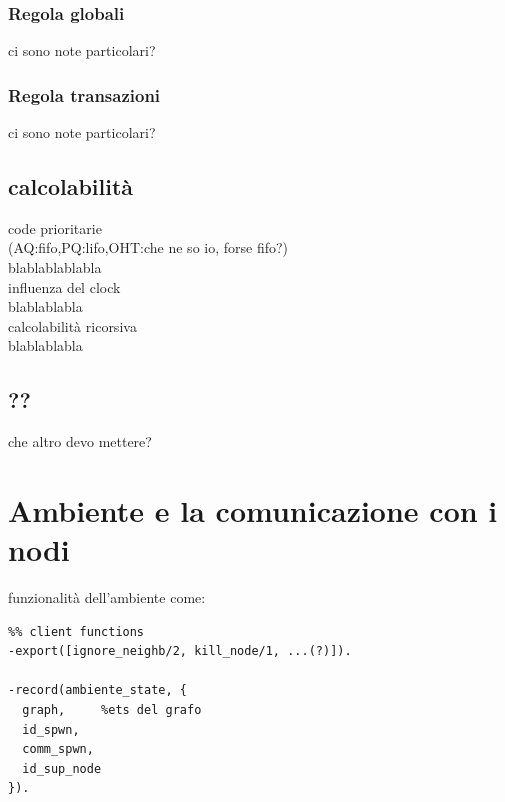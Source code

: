 \documentclass[italian]{memoir}
\begin{document}
\subsubsection{Regola globali}
ci sono note particolari?
\subsubsection{Regola transazioni}
ci sono note particolari?

\subsection{calcolabilità}
code prioritarie\\ (AQ:fifo,PQ:lifo,OHT:che ne so io, forse fifo?)\\blablablablabla\\
influenza del clock\\
blablablabla\\
calcolabilità ricorsiva\\
blablablabla\\

\subsection{??}
che altro devo mettere?

\section{Ambiente e la comunicazione con i nodi}
funzionalità dell'ambiente come:
\begin{verbatim}
%% client functions
-export([ignore_neighb/2, kill_node/1, ...(?)]).

-record(ambiente_state, {
  graph,     %ets del grafo
  id_spwn,
  comm_spwn,
  id_sup_node
}).
\end{verbatim}
\end{document}

